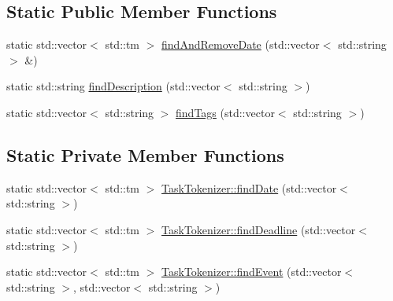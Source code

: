 \subsection*{Static Public Member Functions}
\begin{DoxyCompactItemize}
\item 
static std\+::vector$<$ std\+::tm $>$ \hyperlink{class_do_lah_1_1_task_tokenizer_ae4d5dd5e768250ab52f79cf2333244c0}{find\+And\+Remove\+Date} (std\+::vector$<$ std\+::string $>$ \&)
\item 
static std\+::string \hyperlink{class_do_lah_1_1_task_tokenizer_a685b79ad21e6fbcee9a8444f1ecee242}{find\+Description} (std\+::vector$<$ std\+::string $>$)
\item 
static std\+::vector$<$ std\+::string $>$ \hyperlink{class_do_lah_1_1_task_tokenizer_a18c52165865d50a601ee80de7e5b842b}{find\+Tags} (std\+::vector$<$ std\+::string $>$)
\end{DoxyCompactItemize}
\subsection*{Static Private Member Functions}
\begin{DoxyCompactItemize}
\item 
static std\+::vector$<$ std\+::tm $>$ \hyperlink{class_do_lah_1_1_task_tokenizer_a2bb2e8d0d007af6186401bb46e205510}{Task\+Tokenizer\+::find\+Date} (std\+::vector$<$ std\+::string $>$)
\item 
static std\+::vector$<$ std\+::tm $>$ \hyperlink{class_do_lah_1_1_task_tokenizer_a82b33da61aae5f6ae01aceaf470d8aaa}{Task\+Tokenizer\+::find\+Deadline} (std\+::vector$<$ std\+::string $>$)
\item 
static std\+::vector$<$ std\+::tm $>$ \hyperlink{class_do_lah_1_1_task_tokenizer_ae5c39a94f0663c393b23b56dd43bd275}{Task\+Tokenizer\+::find\+Event} (std\+::vector$<$ std\+::string $>$, std\+::vector$<$ std\+::string $>$)
\end{DoxyCompactItemize}
